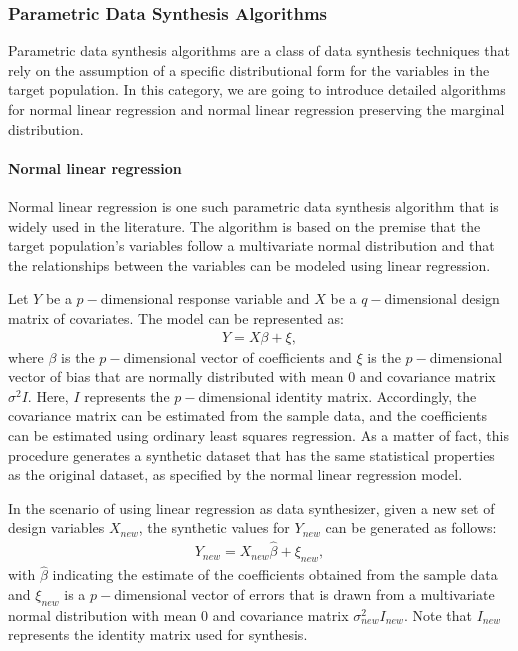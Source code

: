 \subsubsection{Parametric Data Synthesis Algorithms}
\label{subsubsec:para}
Parametric data synthesis algorithms are a class of data synthesis techniques that rely on the assumption of a specific distributional form for the variables in the target population. In this category, we are going to introduce detailed algorithms for normal linear regression and normal linear regression preserving the marginal distribution.

\paragraph{Normal linear regression}
Normal linear regression \citep{su2012linear} is one such parametric data synthesis algorithm that is widely used in the literature. The algorithm is based on the premise that the target population's variables follow a multivariate normal distribution and that the relationships between the variables can be modeled using linear regression.

Let $Y$ be a $p-$dimensional response variable and $X$ be a $q-$dimensional design matrix of covariates. The model can be represented as:
\begin{align}
    \label{equ:lm-org}
    Y=X\beta+\xi,
\end{align}
where $\beta$ is the $p-$dimensional vector of coefficients and $\xi$ is the $p-$dimensional vector of bias that are normally distributed with mean $0$ and covariance matrix $\sigma^2I$. Here, $I$ represents the $p-$dimensional identity matrix. Accordingly, the covariance matrix can be estimated from the sample data, and the coefficients can be estimated using ordinary least squares regression. As a matter of fact, this procedure generates a synthetic dataset that has the same statistical properties as the original dataset, as specified by the normal linear regression model.

In the scenario of using linear regression as data synthesizer, given a new set of design variables $X_{new}$, the synthetic values for $Y_{new}$ can be generated as follows:
\begin{align}
    \label{equ:lm-syn}
    Y_{new}=X_{new}\hat{\beta}+\xi_{new},
\end{align}
with $\hat{\beta}$ indicating the estimate of the coefficients obtained from the sample data and $\xi_{new}$ is a $p-$dimensional vector of errors that is drawn from a multivariate normal distribution with mean $0$ and covariance matrix $\sigma_{new}^2I_{new}$. Note that $I_{new}$ represents the identity matrix used for synthesis.

